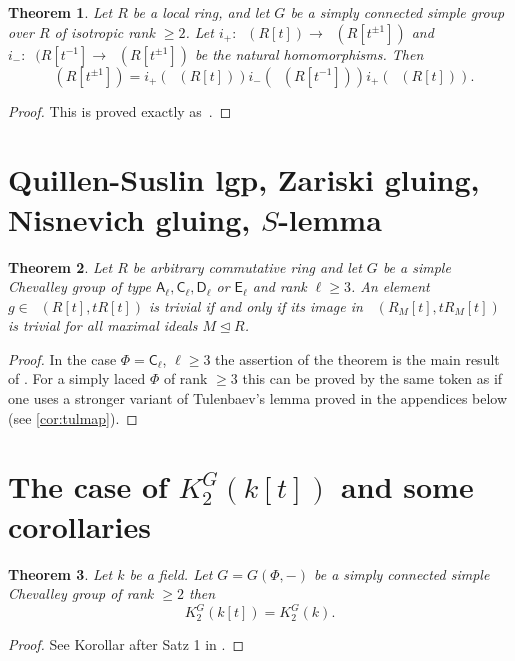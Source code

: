 \documentclass[oneside,12pt]{amsart}
\newtheorem{thm}{Theorem}
\numberwithin{equation}{section}
\numberwithin{lem}{section}
\theoremstyle{definition}
\theoremstyle{remark}
\DeclareMathOperator{\St}{St^G}
\newcommand{\rA}{\mathsf{A}}
\newcommand{\rC}{\mathsf{C}}
\newcommand{\rD}{\mathsf{D}}
\newcommand{\rE}{\mathsf{E}}
\begin{document}
\begin{thm}\label{thm:3t}
Let $R$ be a local ring, and let $G$ be a simply connected simple group over $R$
of isotropic rank $\ge 2$. Let $i_+:\St(R[t])\to\St(R[t^{\pm 1}])$ and $i_-:\St(R[t^{-1}]\to
\St(R[t^{\pm 1}])$ be the natural homomorphisms.
Then
$$
\St(R[t^{\pm 1}])=i_+(\St(R[t]))i_-(\St(R[t^{-1}]))i_+(\St(R[t])).
$$
\end{thm}
\begin{proof}
This is proved exactly as~\cite[Theorem 5.1]{St-poly}.
\end{proof}


\section{Quillen-Suslin lgp, Zariski gluing, Nisnevich gluing, $S$-lemma}

\begin{thm}\label{thm:lg-k2}
Let $R$ be arbitrary commutative ring and let $G$ be a simple Chevalley group of type $\rA_\ell, \rC_\ell, \rD_\ell$ or $\rE_\ell$ and rank $\ell \geq 3$.
An element $g \in \St(R[t], tR[t])$ is trivial if and only if
its image in $\St(R_M[t], tR_M[t])$ is trivial for all maximal ideals $M \trianglelefteq R$.
\end{thm}
\begin{proof}
In the case $\Phi=\rC_\ell$, $\ell\geq 3$ the assertion of the theorem is the main result of \cite{La15}.
For a simply laced $\Phi$ of rank $\geq 3$ this can be proved by the same token as \cite[Theorem~2]{S15} if one uses a stronger variant of Tulenbaev's lemma
proved in the appendices below (see \cref{cor:tulmap}).
\end{proof}

\section{The case of $K_2^G(k[t])$ and some corollaries}

\begin{thm}\label{thm:k[t]}
Let $k$ be a field.
Let $G=G(\Phi,-)$ be a simply connected simple Chevalley group of rank $\ge 2$ then $$K_2^G(k[t])=K_2^G(k).$$
\end{thm}
\begin{proof}
 See Korollar after Satz 1 in \cite{Re75}.
\end{proof}
\end{document}
